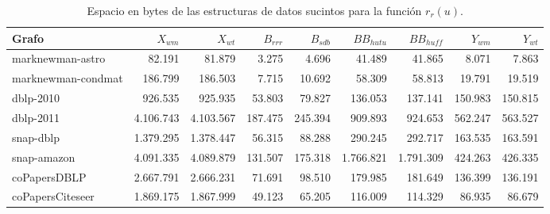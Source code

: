 \begin{table}[t]
	\caption{Espacio en bytes de las estructuras de datos sucintos para la función $r_{r}(u)$.}
	\label{table:sdslBitsRr}
	\centering
	\footnotesize
	\begin{tabular}{l||r|r||r|r||r|r||r|r}
		\toprule
		Grafo & $X_{wm}$ & $X_{wt}$ & $B_{rrr}$ & $B_{sdb}$ & $BB_{hutu}$ & $BB_{huff}$ & $Y_{wm}$ & $Y_{wt}$ \\
		\midrule
		marknewman-astro & 82.191 & 81.879 & 3.275 & 4.696 & 41.489 & 41.865 & 8.071 & 7.863 \\
        marknewman-condmat & 186.799 & 186.503 & 7.715 & 10.692 & 58.309 & 58.813 & 19.791 & 19.519 \\
        dblp-2010 & 926.535 & 925.935 & 53.803 & 79.827 & 136.053 & 137.141 & 150.983 & 150.815 \\
        dblp-2011 & 4.106.743 & 4.103.567 & 187.475 & 245.394 & 909.893 & 924.653 & 562.247 & 563.527 \\
        snap-dblp & 1.379.295 & 1.378.447 & 56.315 & 88.288 & 290.245 & 292.717 & 163.535 & 163.591 \\
        snap-amazon & 4.091.335 & 4.089.879 & 131.507 & 175.318 & 1.766.821 & 1.791.309 & 424.263 & 426.335 \\
        coPapersDBLP & 2.667.791 & 2.666.231 & 71.691 & 98.510 & 179.985 & 181.649 & 136.399 & 136.191 \\
        coPapersCiteseer & 1.869.175 & 1.867.999 & 49.123 & 65.205 & 116.009 & 114.329 & 86.935 & 86.679 \\
        \bottomrule
	\end{tabular}
\end{table}









